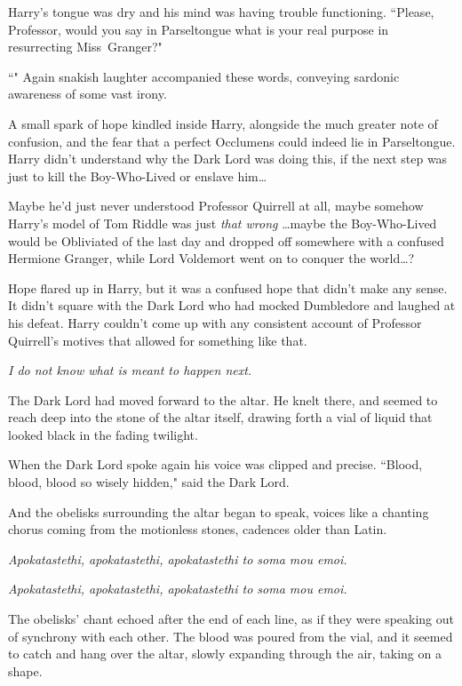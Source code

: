 Harry's tongue was dry and his mind was having trouble functioning. ``Please, Professor, would you say in Parseltongue what is your real purpose in resurrecting Miss~Granger?"

``" Again snakish laughter accompanied these words, conveying sardonic awareness of some vast irony.

A small spark of hope kindled inside Harry, alongside the much greater note of confusion, and the fear that a perfect Occlumens could indeed lie in Parseltongue. Harry didn't understand why the Dark Lord was doing this, if the next step was just to kill the Boy-Who-Lived or enslave him{\ldots}

Maybe he'd just never understood Professor Quirrell at all, maybe somehow Harry's model of Tom Riddle was just \emph{that wrong} {\ldots}maybe the Boy-Who-Lived would be Obliviated of the last day and dropped off somewhere with a confused Hermione Granger, while Lord Voldemort went on to conquer the world{\ldots}?

Hope flared up in Harry, but it was a confused hope that didn't make any sense. It didn't square with the Dark Lord who had mocked Dumbledore and laughed at his defeat. Harry couldn't come up with any consistent account of Professor Quirrell's motives that allowed for something like that.

\emph{I do not know what is meant to happen next.}

The Dark Lord had moved forward to the altar. He knelt there, and seemed to reach deep into the stone of the altar itself, drawing forth a vial of liquid that looked black in the fading twilight.

When the Dark Lord spoke again his voice was clipped and precise. ``Blood, blood, blood so wisely hidden," said the Dark Lord.

And the obelisks surrounding the altar began to speak, voices like a chanting chorus coming from the motionless stones, cadences older than Latin.

\emph{Apokatastethi, apokatastethi, apokatastethi to soma mou emoi.}

\emph{Apokatastethi, apokatastethi, apokatastethi to soma mou emoi.}

The obelisks' chant echoed after the end of each line, as if they were speaking out of synchrony with each other. The blood was poured from the vial, and it seemed to catch and hang over the altar, slowly expanding through the air, taking on a shape.

